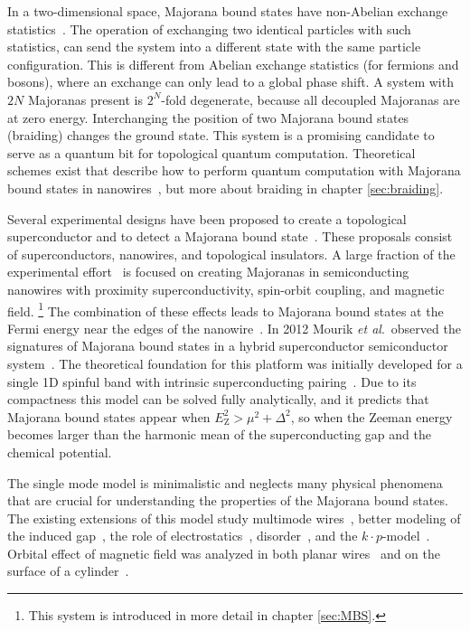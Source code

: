 In a two-dimensional space, Majorana bound states have non-Abelian exchange statistics~\cite{Stern2010}.
The operation of exchanging two identical particles with such statistics, can send the system into a different state with the same particle configuration.
This is different from Abelian exchange statistics (for fermions and bosons), where an exchange can only lead to a global phase shift.
A system with $2N$ Majoranas present is $2^{N}$-fold degenerate, because all decoupled Majoranas are at zero energy.
Interchanging the position of two Majorana bound states (braiding) changes the ground state.
This system is a promising candidate to serve as a quantum bit for topological quantum computation.
Theoretical schemes exist that describe how to perform quantum computation with Majorana bound states in nanowires~\cite{Hyart2013,Alicea2011}, but more about braiding in chapter \ref{sec:braiding}.

Several experimental designs have been proposed to create a topological superconductor and to detect a Majorana bound state~\cite{Kitaev2001,Leijnse2012,Beenakker2013,Alicea2012}.
These proposals consist of superconductors, nanowires, and topological insulators.
A large fraction of the experimental effort~\cite{Mourik2012,Das2012,Deng2012,Churchill2013,Deng2014} is focused on creating Majoranas in semiconducting nanowires with proximity superconductivity, spin-orbit coupling, and magnetic field.
\footnote{This system is introduced in more detail in chapter \ref{sec:MBS}.}
The combination of these effects leads to Majorana bound states at the Fermi energy near the edges of the nanowire~\cite{Oreg2010,Lutchyn2010}.
In 2012 Mourik\textit{ et al}.~observed the signatures of Majorana bound states in a hybrid superconductor semiconductor system~\cite{Mourik2012}.
The theoretical foundation for this platform was initially developed for a single 1D spinful band with intrinsic superconducting pairing~\cite{Lutchyn2010,Oreg2010}.
Due to its compactness this model can be solved fully analytically, and it predicts that Majorana bound states appear when $E_{\textrm{Z}}^{2}>\mu^{2}+\Delta^{2}$, so when the Zeeman energy becomes larger than the harmonic mean of the superconducting gap and the chemical potential.

The single mode model is minimalistic and neglects many physical phenomena that are crucial for understanding the properties of the Majorana bound states.
The existing extensions of this model study multimode wires~\cite{Potter2010a}, better modeling of the induced gap~\cite{Liu2012,Stanescu2014}, the role of electrostatics~\cite{Vuik2016}, disorder~\cite{Potter2012,Pientka2012,Adagideli2014}, and the $k\cdot p$-model~\cite{Stanescu2013a}.
Orbital effect of magnetic field was analyzed in both planar wires~\cite{Osca2015a,Lim2012} and on the surface of a cylinder~\cite{SooLim2013}.

